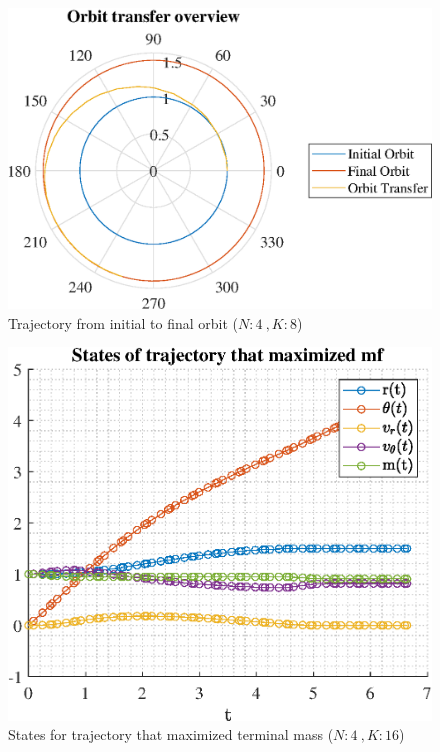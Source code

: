 \documentclass[]{article}
\begin{document}
	\begin{figure}
		\centering
		\includegraphics[scale=0.75]{orbit_N4_K8_C3_mf.eps}
		\caption{Trajectory from initial to final orbit (\(N:4\ , K:8\))}
		\label{fig:orbit_N4_K8_C3_mf}
	\end{figure}
	\begin{figure}
		\centering
		\includegraphics[scale=0.75]{states_N4_K16_C3_mf.eps}
		\caption{States for trajectory that maximized terminal mass (\(N:4\ , K:16\))}
		\label{fig:states_N4_K16_C3_mf}
	\end{figure}
\end{document}
